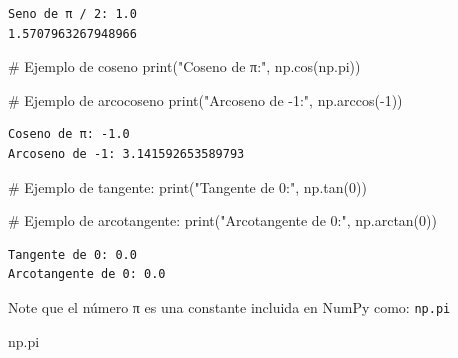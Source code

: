 \documentclass[
  letterpaper,
  DIV=11,
  numbers=noendperiod]{scrreprt}
\newenvironment{Shaded}{\begin{snugshade}}{\end{snugshade}}
\newcommand{\BuiltInTok}[1]{\textcolor[rgb]{0.00,0.23,0.31}{#1}}
\newcommand{\CommentTok}[1]{\textcolor[rgb]{0.37,0.37,0.37}{#1}}
\newcommand{\DecValTok}[1]{\textcolor[rgb]{0.68,0.00,0.00}{#1}}
\newcommand{\NormalTok}[1]{\textcolor[rgb]{0.00,0.23,0.31}{#1}}
\newcommand{\OperatorTok}[1]{\textcolor[rgb]{0.37,0.37,0.37}{#1}}
\newcommand{\StringTok}[1]{\textcolor[rgb]{0.13,0.47,0.30}{#1}}
\begin{document}
\begin{tcolorbox}
\begin{verbatim}
Seno de π / 2: 1.0
1.5707963267948966
\end{verbatim}

\begin{Shaded}
\begin{Highlighting}[]
\CommentTok{\# Ejemplo de coseno}
\BuiltInTok{print}\NormalTok{(}\StringTok{"Coseno de π:"}\NormalTok{, np.cos(np.pi))}

\CommentTok{\# Ejemplo de arcocoseno}
\BuiltInTok{print}\NormalTok{(}\StringTok{"Arcoseno de {-}1:"}\NormalTok{, np.arccos(}\OperatorTok{{-}}\DecValTok{1}\NormalTok{))}
\end{Highlighting}
\end{Shaded}

\begin{verbatim}
Coseno de π: -1.0
Arcoseno de -1: 3.141592653589793
\end{verbatim}

\begin{Shaded}
\begin{Highlighting}[]
\CommentTok{\# Ejemplo de tangente:}
\BuiltInTok{print}\NormalTok{(}\StringTok{"Tangente de 0:"}\NormalTok{, np.tan(}\DecValTok{0}\NormalTok{))}

\CommentTok{\# Ejemplo de arcotangente:}
\BuiltInTok{print}\NormalTok{(}\StringTok{"Arcotangente de 0:"}\NormalTok{, np.arctan(}\DecValTok{0}\NormalTok{))}
\end{Highlighting}
\end{Shaded}

\begin{verbatim}
Tangente de 0: 0.0
Arcotangente de 0: 0.0
\end{verbatim}

\begin{tcolorbox}[enhanced jigsaw, arc=.35mm, toptitle=1mm, colframe=quarto-callout-note-color-frame, bottomtitle=1mm, opacitybacktitle=0.6, colbacktitle=quarto-callout-note-color!10!white, leftrule=.75mm, coltitle=black, toprule=.15mm, titlerule=0mm, title=\textcolor{quarto-callout-note-color}{\faInfo}\hspace{0.5em}{Note}, bottomrule=.15mm, rightrule=.15mm, colback=white, breakable, opacityback=0, left=2mm]

Note que el número π es una constante incluida en NumPy como:
\texttt{np.pi}

\end{tcolorbox}

\begin{Shaded}
\begin{Highlighting}[]
\NormalTok{np.pi}
\end{Highlighting}
\end{Shaded}


\end{tcolorbox}
\end{document}
